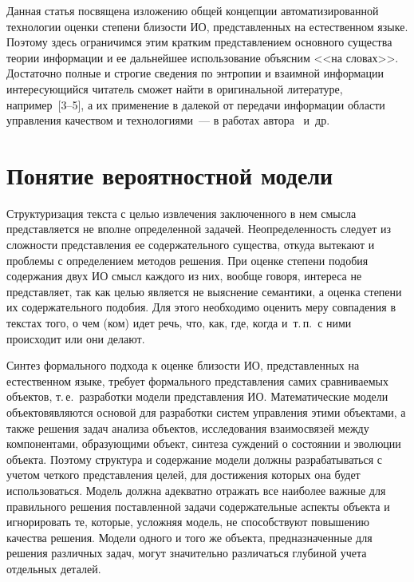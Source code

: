 \begin{multicols}{2}
   Данная статья посвящена изложению общей концепции 
автоматизированной технологии оценки степени близости ИО, 
представленных на естественном языке. Поэтому здесь ограничимся этим 
кратким представлением основного существа теории информации и ее 
дальнейшее использование объясним <<на словах>>. Достаточно полные и 
строгие сведения по энтропии и взаимной информации интересующийся 
читатель сможет найти в оригинальной литературе, например~[3--5], а их 
применение в далекой от передачи информации области управления 
качеством и технологиями~--- в работах автора~\cite{6-k, 7-k} и~др.

\section{Понятие вероятностной модели}

   Структуризация текста с целью извлечения заключенного в нем смысла 
представляется не вполне определенной задачей. Неопределенность следует 
из сложности представления ее содержательного существа, откуда вытекают 
и проблемы с определением методов решения. При оценке степени подобия 
содержания двух ИО смысл каждого из них, вообще 
говоря, интереса не представляет, так как целью является не выяснение 
семантики, а оценка степени их содержательного подобия. Для этого 
необходимо оценить меру совпадения в текстах того, о чем (ком) идет речь, 
что, как, где, когда и~т.\,п.\ с ними происходит или они делают. 
   
   Синтез формального подхода к оценке бли\-зости ИО, представленных на 
естественном языке, тре\-бу\-ет формального пред\-став\-ления самих 
срав\-ни\-ва\-емых объектов, т.\,е.\ разработки модели представления ИО. 
Математические модели объектов\linebreak являются основой для разработки систем 
управления этими объектами, а также решения задач анализа объектов, 
исследования взаимосвязей между компонентами, образующими объект, 
синтеза суж\-дений о состоянии и эволюции объекта. Поэтому структура и 
содержание модели должны разрабатываться с учетом четкого представления 
целей, для достижения которых она будет использоваться. Модель должна 
адекватно отражать все наиболее важные для правильного решения 
поставленной задачи содержательные аспекты объекта и игнорировать те, 
которые, усложняя модель, не способствуют повышению качества решения. 
Модели одного и того же объекта, предназначенные для решения различных 
задач, могут значительно различаться глубиной учета отдельных деталей. 
   

\end{multicols}
